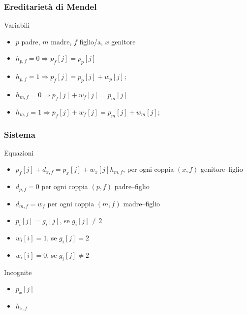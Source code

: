 \begin{frame}
\frametitle{Ereditarietà di Mendel}
\begin{block}{Variabili}
\begin{itemize}
\item
$p$ padre, $m$ madre, $f$ figlio/a, $x$ genitore
\item
$h_{p,f}=0 \Rightarrow p_{f}[j] = p_{p}[j]$
\item
$h_{p,f}=1 \Rightarrow p_{f}[j] = p_{p}[j]  + w_{p}[j]$;
\item
$h_{m,f}=0 \Rightarrow p_{f}[j] + w_{f}[j] = p_{m}[j]$
\item
$h_{m,f}=1 \Rightarrow p_{f}[j] + w_{f}[j]  = p_{m}[j]  + w_{m}[j]$;
\end{itemize}
\end{block}
\end{frame}

\begin{frame}
\frametitle{Sistema}
\begin{block}{Equazioni}
\begin{itemize}
\item
$p_{f}[j] + d_{x,f} = p_{x}[j]  + w_{x}[j] h_{m,f}$, per ogni coppia $(x,f)$ genitore--figlio
\item
$d_{p,f}=0$ per ogni coppia $(p,f)$ padre--figlio
\item
$d_{m,f} = w_{f}$ per ogni coppia $(m,f)$ madre--figlio
\item
$p_{i}[j] = g_{i}[j]$, se $g_{i}[j] \neq 2$
\item
$w_{i}[i] = 1$, se $g_{i}[j] = 2$
\item
$w_{i}[i] = 0$, se $g_{i}[j] \neq 2$
\end{itemize}
\end{block}
\begin{block}{Incognite}
\begin{itemize}
\item
$p_{x}[j]$
\item
$h_{x,f}$
\end{itemize}
\end{block}
\end{frame}

